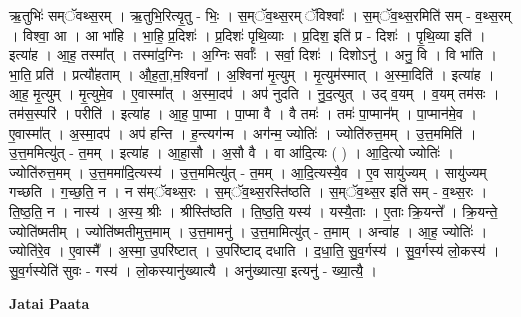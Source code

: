 \documentclass[17pt]{extarticle}
\begin{document}
ऋ॒तुभिः॑ सम्ॅवथ्स॒रम् । ऋ॒तुभि॒रित्यृ॒तु - भिः॒ । स॒म्ॅव॒थ्स॒रम् ॅविश्वाः᳚ । स॒म्ॅव॒थ्स॒रमिति॑ सम् - व॒थ्स॒रम् । विश्वा॒ आ । आ भा॑हि । भा॒हि॒ प्र॒दिशः॑ । प्र॒दिशः॑ पृथि॒व्याः । प्र॒दिश॒ इति॑ प्र - दिशः॑ । पृ॒थि॒व्या इति॑ । इत्या॑ह । आ॒ह॒ तस्मा᳚त् । तस्मा॑द॒ग्निः । अ॒ग्निः सर्वाः᳚ । सर्वा॒ दिशः॑ । दिशोऽनु॑ । अनु॒ वि । वि भा॑ति । भा॒ति॒ प्रति॑ । प्रत्यौ॑हताम् । औ॒ह॒ता॒,म॒श्विना᳚ । अ॒श्विना॑ मृ॒त्युम् । मृ॒त्युम॑स्मात् । अ॒स्मा॒दिति॑ । इत्या॑ह । आ॒ह॒ मृ॒त्युम् । मृ॒त्युमे॒व । ए॒वास्मा᳚त् । अ॒स्मा॒दप॑ । अप॑ नुदति । नु॒द॒त्युत् । उद् व॒यम् । व॒यम् तम॑सः । तम॑स॒स्परि॑ । परीति॑ । इत्या॑ह । आ॒ह॒ पा॒प्मा । पा॒प्मा वै । वै तमः॑ । तमः॑ पा॒प्मान᳚म् । पा॒प्मान॑मे॒व । ए॒वास्मा᳚त् । अ॒स्मा॒दप॑ । अप॑ हन्ति । ह॒न्त्यग॑न्म । अग॑न्म॒ ज्योतिः॑ । ज्योति॑रुत्त॒मम् । उ॒त्त॒ममिति॑ । उ॒त्त॒ममित्यु॑त् - त॒मम् । इत्या॑ह । आ॒हा॒सौ । अ॒सौ वै । वा आ॑दि॒त्यः ( ) । आ॒दि॒त्यो ज्योतिः॑ । ज्योति॑रुत्त॒मम् । उ॒त्त॒ममा॑दि॒त्यस्य॑ । उ॒त्त॒ममित्यु॑त् - त॒मम् । आ॒दि॒त्यस्यै॒व । ए॒व सायु॑ज्यम् । सायु॑ज्यम् गच्छति । ग॒च्छ॒ति॒ न । न स॑म्ॅवथ्स॒रः । स॒म्ॅव॒थ्स॒रस्ति॑ष्ठति । स॒म्ॅव॒थ्स॒र इति॑ सम् - व॒थ्स॒रः । ति॒ष्ठ॒ति॒ न । नास्य॑ । अ॒स्य॒ श्रीः । श्रीस्ति॑ष्ठति । ति॒ष्ठ॒ति॒ यस्य॑ । यस्यै॒ताः । ए॒ताः क्रि॒यन्ते᳚ । क्रि॒यन्ते॒ ज्योति॑ष्मतीम् । ज्योति॑ष्मतीमुत्त॒माम् । उ॒त्त॒मामनु॑ । उ॒त्त॒मामित्यु॑त् - त॒माम् । अन्वा॑ह । आ॒ह॒ ज्योतिः॑ । ज्योति॑रे॒व । ए॒वास्मै᳚ । अ॒स्मा॒ उ॒परि॑ष्टात् । उ॒परि॑ष्टाद् दधाति । द॒धा॒ति॒ सु॒व॒र्गस्य॑ । सु॒व॒र्गस्य॑ लो॒कस्य॑ । सु॒व॒र्गस्येति॑ सुवः - गस्य॑ । लो॒कस्यानु॑ख्यात्यै । अनु॑ख्यात्या॒ इत्यनु॑ - ख्या॒त्यै॒ । \newline

\textbf{Jatai Paata} \newline
\end{document}
